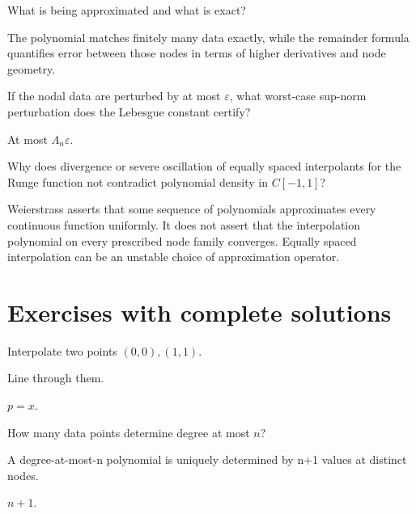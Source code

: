 \begin{problem}\label{prob:ii20-problem-12}
What is being approximated and what is exact?
\end{problem}
\begin{solution}
The polynomial matches finitely many data exactly, while the remainder formula quantifies error between those nodes in terms of higher derivatives and node geometry.
\end{solution}

\begin{problem}\label{prob:ii20-problem-13}
If the nodal data are perturbed by at most $\varepsilon$, what worst-case sup-norm perturbation does the Lebesgue constant certify?
\end{problem}
\begin{solution}
At most $\Lambda_n\varepsilon$.
\end{solution}

\begin{problem}\label{prob:ii20-problem-14}
Why does divergence or severe oscillation of equally spaced interpolants for the Runge function not contradict polynomial density in $C[-1,1]$?
\end{problem}
\begin{solution}
Weierstrass asserts that some sequence of polynomials approximates every continuous function uniformly. It does not assert that the interpolation polynomial on every prescribed node family converges. Equally spaced interpolation can be an unstable choice of approximation operator.
\end{solution}

\section{Exercises with complete solutions}

\begin{exercise}\label{exr:ii20-01}
Interpolate two points $(0,0),(1,1)$.
\end{exercise}
\begin{hint}
Line through them.
\end{hint}
\begin{solution}
$p=x$.
\end{solution}

\begin{exercise}\label{exr:ii20-02}
How many data points determine degree at most $n$?
\end{exercise}
\begin{hint}
A degree-at-most-n polynomial is uniquely determined by n+1 values at distinct nodes.
\end{hint}
\begin{solution}
$n+1$.
\end{solution}


